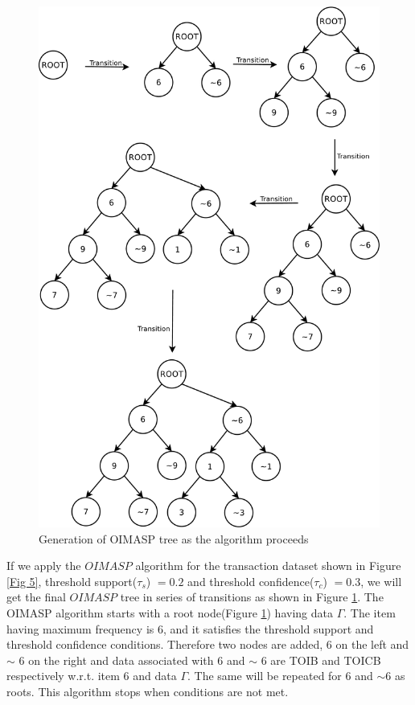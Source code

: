 \documentclass[preprint]{elsarticle}
\begin{document}
\begin{figure}
\begin{center}
\includegraphics[scale=0.3]{pdf/transition}
\end{center}
\caption{Generation of OIMASP tree as the algorithm proceeds}
\label{Fig 6}
\end{figure}

If we apply the $ OIMASP $ algorithm for the transaction dataset shown in Figure \ref{Fig 5}, threshold support($ \tau _{s} $) $ = 0.2 $ and threshold confidence($ \tau _{c} $) $ = 0.3 $, we will get the final $ OIMASP $ tree in series of transitions as shown in Figure \ref{Fig 6}. The OIMASP algorithm starts with a root node(Figure \ref{Fig 6}) having data $ \Gamma $. The item having maximum frequency is 6, and it satisfies the threshold support and threshold confidence conditions. Therefore two nodes are added, 6 on the left and $ \sim $ 6 on the right and data associated with 6 and  $ \sim $ 6 are TOIB and TOICB respectively w.r.t. item 6 and data $ \Gamma $. The same will be repeated for 6 and $ \sim $6 as roots. This algorithm stops when conditions are not met.
\end{document}
